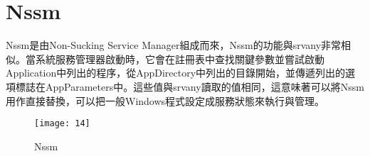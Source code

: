 \renewcommand{\baselinestretch}{20} %
\section{Nssm}
\par
\renewcommand{\baselinestretch}{1} %
\twelve Nssm是由Non-Sucking Service Manager組成而來，Nssm的功能與srvany非常相似。當系統服務管理器啟動時，它會在註冊表中查找關鍵參數並嘗試啟動Application中列出的程序，從AppDirectory中列出的目錄開始，並傳遞列出的選項標誌在AppParameters中。這些值與srvany讀取的值相同，這意味著可以將Nssm用作直接替換，可以把一般Windows程式設定成服務狀態來執行與管理。
\\
\par
\renewcommand{\baselinestretch}{1.7} %
\begin{figure}[hbt!]
\begin{center}
\texttt{[image: 14]}
\caption{\large Nssm}\label{fig.Nssm}
\end{center}
\end{figure}
\par

\renewcommand{\baselinestretch}{20} %
